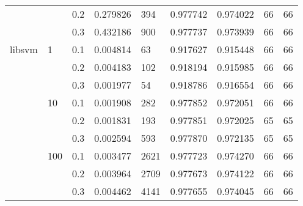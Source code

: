 \begin{table}[h!]
\begin{tabular}{lllrlrrrr}
       &     & 0.2 &  0.279826 &    394 &  0.977742 &  0.974022 &          66 &        66 \\
       &     & 0.3 &  0.432186 &    900 &  0.977737 &  0.973939 &          66 &        66 \\
libsvm & 1   & 0.1 &  0.004814 &     63 &  0.917627 &  0.915448 &          66 &        66 \\
       &     & 0.2 &  0.004183 &    102 &  0.918194 &  0.915985 &          66 &        66 \\
       &     & 0.3 &  0.001977 &     54 &  0.918786 &  0.916554 &          66 &        66 \\
       & 10  & 0.1 &  0.001908 &    282 &  0.977852 &  0.972051 &          66 &        66 \\
       &     & 0.2 &  0.001831 &    193 &  0.977851 &  0.972025 &          65 &        65 \\
       &     & 0.3 &  0.002594 &    593 &  0.977870 &  0.972135 &          65 &        65 \\
       & 100 & 0.1 &  0.003477 &   2621 &  0.977723 &  0.974270 &          66 &        66 \\
       &     & 0.2 &  0.003964 &   2709 &  0.977673 &  0.974122 &          66 &        66 \\
       &     & 0.3 &  0.004462 &   4141 &  0.977655 &  0.974045 &          66 &        66 \\
\bottomrule
\end{tabular}
\end{table}
